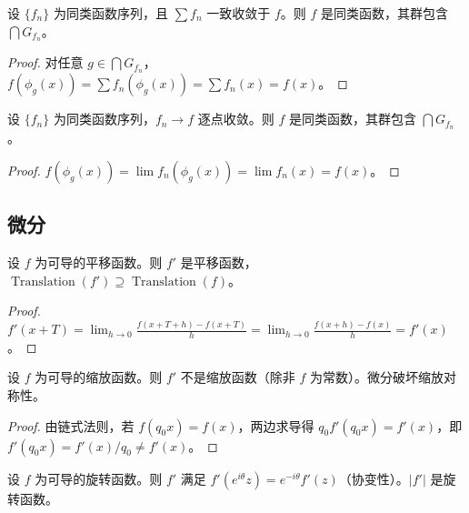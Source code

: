 \begin{proposition}[级数展开下各性质的传递性]\label{prop:series_all}
设 $\{f_n\}$ 为同类函数序列，且 $\sum f_n$ 一致收敛于 $f$。则 $f$ 是同类函数，其群包含 $\bigcap G_{f_n}$。
\end{proposition}

\begin{proof}
对任意 $g \in \bigcap G_{f_n}$，$f(\phi_g(x)) = \sum f_n(\phi_g(x)) = \sum f_n(x) = f(x)$。
\end{proof}

\begin{proposition}[极限下各性质的传递性]\label{prop:limit_all}
设 $\{f_n\}$ 为同类函数序列，$f_n \to f$ 逐点收敛。则 $f$ 是同类函数，其群包含 $\bigcap G_{f_n}$。
\end{proposition}

\begin{proof}
$f(\phi_g(x)) = \lim f_n(\phi_g(x)) = \lim f_n(x) = f(x)$。
\end{proof}

\subsection{微分}

\begin{proposition}\label{prop:diff_translation}
设 $f$ 为可导的平移函数。则 $f'$ 是平移函数，$\operatorname{Translation}(f') \supseteq \operatorname{Translation}(f)$。
\end{proposition}

\begin{proof}
$f'(x+T) = \lim_{h \to 0} \frac{f(x+T+h) - f(x+T)}{h} = \lim_{h \to 0} \frac{f(x+h) - f(x)}{h} = f'(x)$。
\end{proof}

\begin{proposition}[微分破坏缩放对称性]\label{prop:diff_scaling}
设 $f$ 为可导的缩放函数。则 $f'$ 不是缩放函数（除非 $f$ 为常数）。微分破坏缩放对称性。
\end{proposition}

\begin{proof}
由链式法则，若 $f(q_0 x) = f(x)$，两边求导得 $q_0 f'(q_0 x) = f'(x)$，即 $f'(q_0 x) = f'(x)/q_0 \neq f'(x)$。
\end{proof}

\begin{proposition}[微分下旋转性质的协变保持]\label{prop:diff_rotation}
设 $f$ 为可导的旋转函数。则 $f'$ 满足 $f'(e^{i\theta}z) = e^{-i\theta} f'(z)$（协变性）。$|f'|$ 是旋转函数。
\end{proposition}

